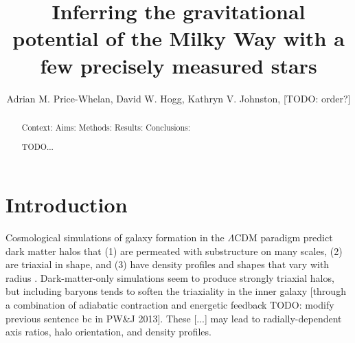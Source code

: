 \documentclass[letterpaper,12pt,preprint]{aastex}
\begin{document}
\title{Inferring the gravitational potential of the Milky Way with a few precisely measured stars}
\author{Adrian M. Price-Whelan, David W. Hogg, Kathryn V. Johnston, [TODO: order?]}

\begin{abstract}
Context:
Aims: 
Methods:
Results:
Conclusions:

TODO...
\end{abstract}


\section{Introduction}

Cosmological simulations of galaxy formation in the $\Lambda$CDM paradigm predict dark matter halos that (1) are permeated with substructure on many scales, (2) are triaxial in shape, and (3) have density profiles and shapes that vary with radius \citep{dubinski91, jing02, kuhlen07, veraciro11}. Dark-matter-only simulations seem to produce strongly triaxial halos, but including baryons tends to soften the triaxiality in the inner galaxy [through a combination of adiabatic contraction and energetic feedback \citep[see recent discussion by][]{pontzen12} TODO: modify previous sentence bc in PW\&J 2013]. These [...] may lead to radially-dependent axis ratios, halo orientation, and density profiles.
\end{document}
